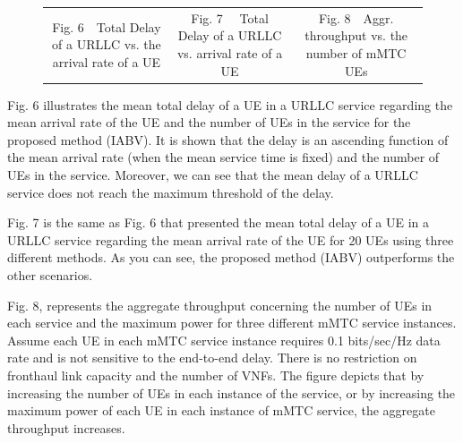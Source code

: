 \documentclass[lettersize,journal]{IEEEtran}
\begin{document}
\begin{figure}[!htb]
{\begin{tabular}{c@{}c@{}c}
			\scriptsize Fig. 6~~Total Delay of a URLLC vs. the arrival rate of a UE  & \scriptsize Fig. 7~~ Total Delay of a URLLC vs. arrival rate of a UE  & \scriptsize Fig. 8~~Aggr. throughput vs. the number of mMTC UEs
	\end{tabular}}
	\vspace*{-3mm}
	\label{label}
\end{figure}

Fig. 6 illustrates the mean total delay of a UE in a URLLC service regarding the mean arrival rate of the UE and the number of UEs in the service for the proposed method (IABV).
It is shown that the delay is an ascending function of the mean arrival rate (when the mean service time is fixed) and the number of UEs in the service.
 Moreover, we can see that the mean delay of a URLLC service
does not reach the maximum threshold of the delay.

Fig. 7 is the same as Fig. 6 that presented the mean total delay of a UE in a URLLC service regarding the mean arrival rate of the UE for 20 UEs using three different methods. As you can see, the proposed method (IABV) outperforms the other scenarios.

Fig. 8, represents the aggregate throughput concerning the number of UEs in each service and the maximum power for three different mMTC service instances. 
Assume each UE in each mMTC service instance requires 0.1 bits/sec/Hz data rate and is not sensitive to the end-to-end delay. There is no restriction on fronthaul link capacity and the number of VNFs.
The figure depicts that by increasing the number of UEs in each instance of the service, or by increasing the maximum power of each UE in each instance of mMTC service, the aggregate throughput increases.
\end{document}
